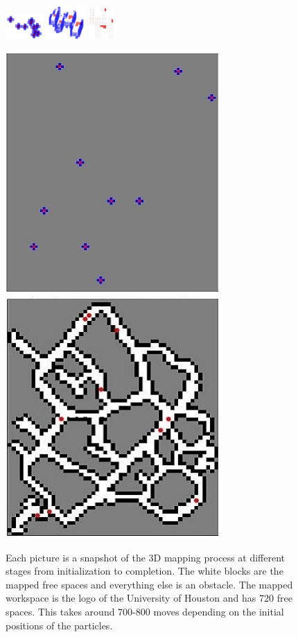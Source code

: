 \documentclass[letterpaper, 9 pt, conference]{ieeeconf}  %
\begin{document}
\begin{figure}
\centering
	\includegraphics[width=0.13\textwidth]{3D_initial}
	\includegraphics[width=0.13\textwidth]{3D_middle}
	\includegraphics[width=0.09\textwidth]{3D_final}
	\caption{Each picture is a snapshot of the 3D mapping process at different stages from initialization to completion. The white blocks are the mapped free spaces and everything else is an obstacle. The mapped workspace is the logo of the University of Houston and has 720 free spaces. This takes around 700-800 moves depending on the initial positions of the particles.}
\centering
	\includegraphics[width=0.09\paperheight]{2D_720_initial.jpg}
	\includegraphics[width=0.09\paperheight]{10particles_final.jpg}

\end{figure}
\end{document}
